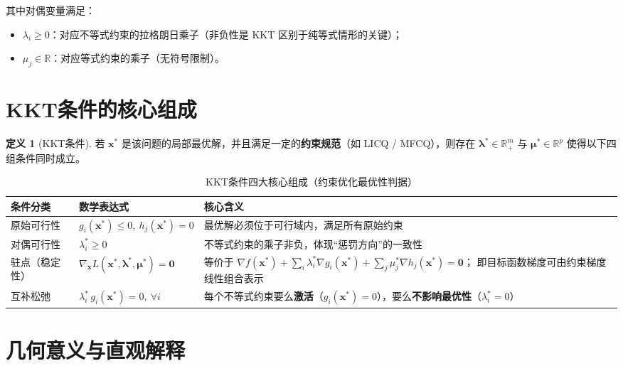 \documentclass[12pt,a4paper]{ctexart}
\renewcommand{\vec}[1]{\boldsymbol{#1}} %
\theoremstyle{definition}
\newtheorem{definition}{定义}[section]
\theoremstyle{plain}
\begin{document}
	其中对偶变量满足：
	\begin{itemize}
		\item $\lambda_i\ge 0$：对应不等式约束的拉格朗日乘子（非负性是 KKT 区别于纯等式情形的关键）；
		\item $\mu_j\in\mathbb{R}$：对应等式约束的乘子（无符号限制）。
	\end{itemize}
	
	\section{KKT条件的核心组成}
	\begin{definition}[KKT条件]
		若 $\vec{x}^*$ 是该问题的局部最优解，并且满足一定的\textbf{约束规范}（如 LICQ / MFCQ），则存在
		$\vec{\lambda}^*\in\mathbb{R}^m_+$ 与 $\vec{\mu}^*\in\mathbb{R}^p$ 使得以下四组条件同时成立。
	\end{definition}
	
	\begin{table}[!htbp]
		\centering
		\begin{tabularx}{\linewidth}{@{}l l X@{}}
			\toprule[1pt]
			\textbf{条件分类} & \textbf{数学表达式} & \textbf{核心含义} \\
			\midrule
			原始可行性 &
			$g_i(\vec{x}^*)\le 0,\ h_j(\vec{x}^*)=0$ &
			最优解必须位于可行域内，满足所有原始约束 \\
			\midrule
			对偶可行性 &
			$\lambda_i^*\ge 0$ &
			不等式约束的乘子非负，体现“惩罚方向”的一致性 \\
			\midrule
			驻点（稳定性） &
			$\nabla_{\vec{x}} L(\vec{x}^*,\vec{\lambda}^*,\vec{\mu}^*)=\vec{0}$ &
			等价于
			$\nabla f(\vec{x}^*)+\sum_i\lambda_i^*\nabla g_i(\vec{x}^*)+\sum_j\mu_j^*\nabla h_j(\vec{x}^*)=\vec{0}$；
			即目标函数梯度可由约束梯度线性组合表示 \\
			\midrule
			互补松弛 &
			$\lambda_i^*\,g_i(\vec{x}^*)=0,\ \forall i$ &
			每个不等式约束要么\textbf{激活}（$g_i(\vec{x}^*)=0$），要么\textbf{不影响最优性}（$\lambda_i^*=0$） \\
			\bottomrule[1pt]
		\end{tabularx}
		\vspace{0.35em}
		\caption{KKT条件四大核心组成（约束优化最优性判据）}
		\label{tab:kkt_conditions}
	\end{table}
	
	\section{几何意义与直观解释}
\end{document}
